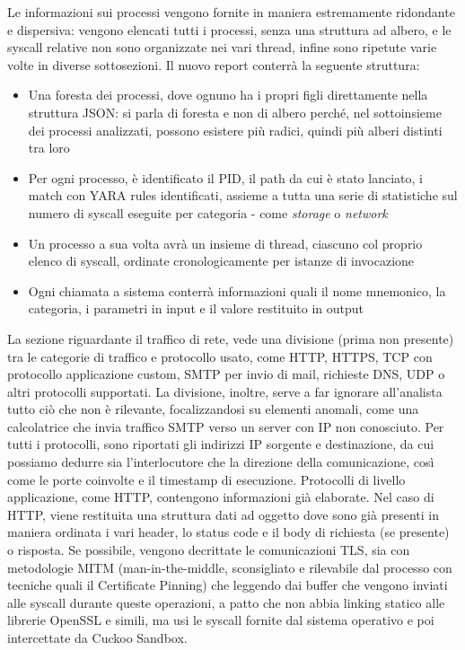Le informazioni sui processi vengono fornite in maniera estremamente ridondante e dispersiva: vengono elencati tutti i processi, senza una struttura ad albero, e le syscall relative non sono organizzate nei vari thread, infine sono ripetute varie volte in diverse sottosezioni.
Il nuovo report conterrà la seguente struttura:
\begin{itemize}
    \item Una foresta dei processi, dove ognuno ha i propri figli direttamente nella struttura JSON: si parla di foresta e non di albero perché, nel sottoinsieme dei processi analizzati, possono esistere più radici, quindi più alberi distinti tra loro
    \item Per ogni processo, è identificato il PID, il path da cui è stato lanciato, i match con YARA rules identificati, assieme a tutta una serie di statistiche sul numero di syscall eseguite per categoria - come \emph{storage} o \emph{network}
    \item Un processo a sua volta avrà un insieme di thread, ciascuno col proprio elenco di syscall, ordinate cronologicamente per istanze di invocazione
    \item Ogni chiamata a sistema conterrà informazioni quali il nome mnemonico, la categoria, i parametri in input e il valore restituito in output
\end{itemize}

La sezione riguardante il traffico di rete, vede una divisione (prima non presente) tra le categorie di traffico e protocollo usato, come HTTP, HTTPS, TCP con protocollo applicazione custom, SMTP per invio di mail, richieste DNS, UDP o altri protocolli supportati. La divisione, inoltre, serve a far ignorare all'analista tutto ciò che non è rilevante, focalizzandosi su elementi anomali, come una calcolatrice che invia traffico SMTP verso un server con IP non conosciuto.
Per tutti i protocolli, sono riportati gli indirizzi IP sorgente e destinazione, da cui possiamo dedurre sia l'interlocutore che la direzione della comunicazione, così come le porte coinvolte e il timestamp di esecuzione.
Protocolli di livello applicazione, come HTTP, contengono informazioni già elaborate. Nel caso di HTTP, viene restituita una struttura dati ad oggetto dove sono già presenti in maniera ordinata i vari header, lo status code e il body di richiesta (se presente) o risposta.
Se possibile, vengono decrittate le comunicazioni TLS, sia con metodologie MITM (man-in-the-middle, sconsigliato e rilevabile dal processo con tecniche quali il Certificate Pinning) che leggendo dai buffer che vengono inviati alle syscall durante queste operazioni, a patto che non abbia linking statico alle librerie OpenSSL e simili, ma usi le syscall fornite dal sistema operativo e poi intercettate da Cuckoo Sandbox.

